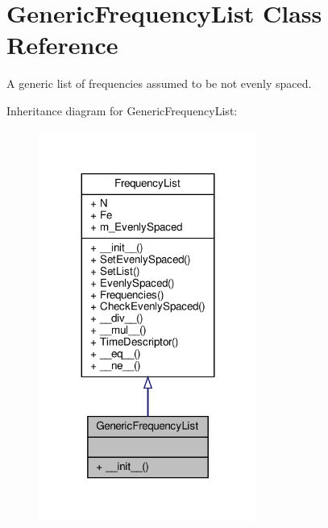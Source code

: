 \hypertarget{classSignalIntegrity_1_1FrequencyDomain_1_1FrequencyList_1_1GenericFrequencyList}{}\section{Generic\+Frequency\+List Class Reference}
\label{classSignalIntegrity_1_1FrequencyDomain_1_1FrequencyList_1_1GenericFrequencyList}


A generic list of frequencies assumed to be not evenly spaced.  




Inheritance diagram for Generic\+Frequency\+List\+:\nopagebreak
\begin{figure}[H]
\begin{center}
\leavevmode
\includegraphics[width=203pt]{classSignalIntegrity_1_1FrequencyDomain_1_1FrequencyList_1_1GenericFrequencyList__inherit__graph}
\end{center}
\end{figure}


